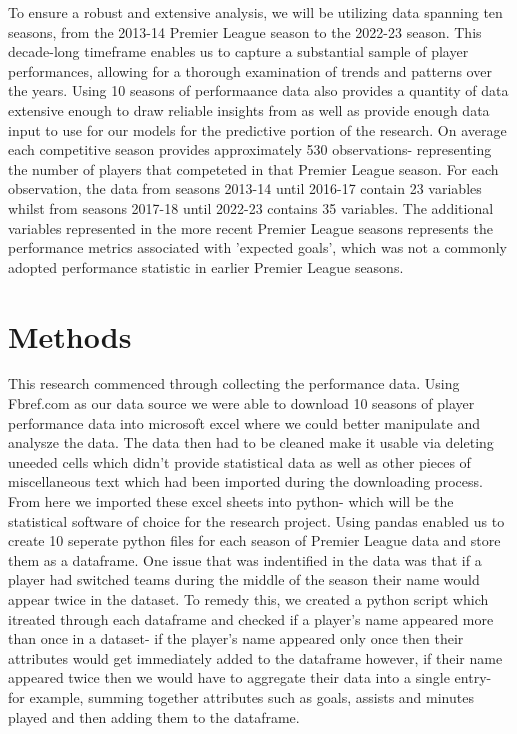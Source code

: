 \documentclass[12pt]{article}
\begin{document}
To ensure a robust and extensive analysis, we will be utilizing data spanning
ten seasons, from the 2013-14 Premier League season to the 2022-23 season.
This decade-long timeframe enables us to capture a substantial sample of player
performances, allowing for a thorough examination of trends and patterns over
the years. Using 10 seasons of performaance data also provides a quantity of 
data extensive enough to draw reliable insights from as well as provide enough
data input to use for our models for the predictive portion of the research.
On average each competitive season provides approximately 530 observations-
representing the number of players that competeted in that Premier League 
season. For each observation, the data from seasons 2013-14 until 2016-17 contain
23 variables whilst from seasons 2017-18 until 2022-23 contains 35 variables.
The additional variables represented in the more recent Premier League seasons
represents the performance metrics associated with 'expected goals', which was
not a commonly adopted performance statistic in earlier Premier League seasons.





\section{Methods}
\label{sec:meth}



This research commenced through collecting the performance data. Using 
Fbref.com as our data source we were able to download 10 seasons of player
performance data into microsoft excel where we could better manipulate and 
analysze the data. 
The data then had to be cleaned make it usable via deleting uneeded cells which
didn't provide statistical data as well as other pieces of miscellaneous text 
which had been imported during the downloading process. 
From here we imported these excel sheets into python- which will be the 
statistical software of choice for the research project. Using pandas enabled
us to create 10 seperate python files for each season of Premier League data and 
store them as a dataframe. One issue that was indentified in the data was that 
if a player had switched teams during the middle of the season their name would 
appear twice in the dataset. To remedy this, we created a python script which 
itreated through each dataframe and checked if a player's name appeared more 
than once in a dataset- if the player's name appeared only once then their attributes
would get immediately added to the dataframe however, if their name appeared twice
then we would have to aggregate their data into a single entry- for example,
summing together attributes such as goals, assists and minutes played and then 
adding them to the dataframe.
\end{document}
